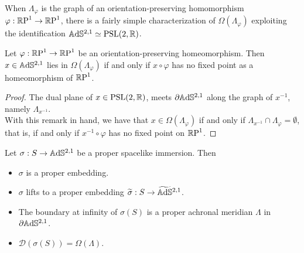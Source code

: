 When $\Lambda_\varphi$ is the graph of an orientation-preserving homomorphism $\varphi:\S\to\S$, there is a fairly simple characterization of $\Omega(\Lambda_\varphi)$ exploiting the identification $\A^{2,1}\simeq \PSL$.


\begin{corollary}\label{454}
    Let $\varphi:\S\to\S$ be an orientation-preserving homeomorphism. Then $x\in\A^{2,1}$ lies in $\Omega(\Lambda_\varphi)$ if and only if $x\circ\varphi$ has no fixed point as a homeomorphism of $\S$.
\end{corollary}
\begin{proof}
    The dual plane of $x\in\PSL$, meets $\partial\A^{2,1}$ along the graph of $x^{-1}$, namely $\Lambda_{x^{-1}}$.\\
    With this remark in hand, we have that $x\in\Omega(\Lambda_\varphi)$ if and only if $\Lambda_{x^{-1}}\cap \Lambda_\varphi=\emptyset$, that is, if and only if $x^{-1}\circ\varphi$ has no fixed point on $\S$.

\end{proof}

\begin{proposition}\label{455}
    Let $\sigma: S\to\A^{2,1}$ be a proper spacelike immersion. Then 
    \begin{itemize}
        \item $\sigma$ is a proper embedding.
        \item $\sigma$ lifts to a proper embedding $\widetilde{\sigma}:S\to\AS^{2,1}$.
        \item The boundary at infinity of $\sigma(S)$ is a proper achronal meridian $\Lambda$ in $\partial\A^{2,1}$.
        \item $\mathcal{D}(\sigma(S))=\Omega(\Lambda).$
    \end{itemize}
\end{proposition}

